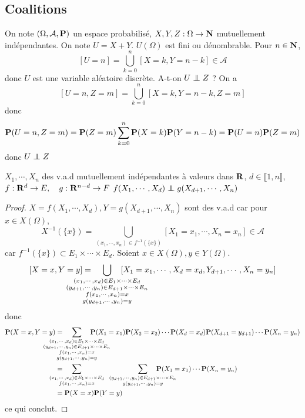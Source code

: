 \subsection{Coalitions}

On note $(\Omega, \mathcal A, \P)$ un espace probabilisé, $X, Y, Z: \Omega \to  \N$ mutuellement indépendantes. On note $U=X+Y$.  $U(\Omega)$ est fini ou dénombrable. Pour  $n\in  \N$, \[
    [U=n]=\bigcup_{k=0}^{n}[X=k,Y=n-k]\in \mathcal A
\] 
donc $U$ est une variable aléatoire discrète. A-t-on  $U\indep Z$ ? On a  \[
    [U=n,Z=m]=\bigcup_{k=0}^{n}[X=k,Y=n-k,Z=m]
\]
donc \[
    \P(U=n,Z=m)=\P(Z=m) \sum_{k=0}^{n} \P(X=k)\P(Y=n-k)=\P(U=n)\P(Z=m)
\]
donc $U\indep Z$

\begin{lmm}
    \Hyp $X_1,\cdots, X_n$ des v.a.d mutuellement indépendantes à valeurs dans $\R$, $d\in \llbracket 1, n\rrbracket$, $f: \R^d\to  E,\quad g: \R^{n-d}\to F$
    \Conc $f(X_1,\cdots, X_d)\indep g(X_{d+1},\cdots ,X_n)$
\end{lmm}

\begin{proof}
    $X=f(X_1,\cdots ,X_d),Y=g(X_{d+1},\cdots ,X_n)$ sont des v.a.d car pour $x\in X(\Omega)$, \[
        X^{-1}(\{x\} )=\bigcup_{(x_1,\cdots ,x_n)\in f^{-1}(\{x\} )} [X_1=x_1,\cdots ,X_n=x_n]\in \mathcal A
    \] car $f^{-1}(\{x\} )\subset E_1\times \cdots \times E_d$. Soient $x\in X(\Omega),y\in Y(\Omega)$. \[
    [X=x,Y=y]=\;\;\;\;\smashoperator{\bigcup_{\substack{(x_1,\cdots ,x_d)\in E_1\times \cdots \times E_d\\(y_{d+1},\cdots ,y_n)\in E_{d+1}\times \cdots \times E_n\\ f(x_1,\cdots ,x_n)=x\\g(y_{d+1},\cdots ,y_n)=y}}} \;\;\;\;[X_1=x_1,\cdots ,X_d=x_d,Y_{d+1},\cdots ,X_n=y_n]
\] donc \begin{align*}
\P(X=x,Y=y)&=\;\;\;\;\smashoperator[lr]{\sum_{\substack{(x_1,\cdots ,x_d)\in E_1\times \cdots \times E_d\\(y_{d+1},\cdots ,y_n)\in E_{d+1}\times \cdots \times E_n\\ f(x_1,\cdots ,x_n)=x\\g(y_{d+1},\cdots ,y_n)=y}}}\;\;\;\; \P(X_1=x_1)\P(X_2=x_2)\cdots \P(X_d=x_d)\P(X_{d+1}=y_{d+1})\cdots \P(X_n=y_n) \\
           &= \;\;\;\;\smashoperator[l]{\sum_{\substack{(x_1,\cdots ,x_d)\in E_1\times \cdots \times E_d\\ f(x_1,\cdots ,x_n)=x}}}\;\;
           \smashoperator[r]{\sum_{\substack{(y_{d+1},\cdots ,y_n)\in E_{d+1}\times \cdots \times E_n\\ g(y_{d+1},\cdots ,y_n)=y}}}\;\;\;\; \P(X_1=x_1)\cdots \P(X_n=y_n) \\
           &= \P(X=x)\P(Y=y)
\end{align*}
ce qui conclut.
\end{proof}

